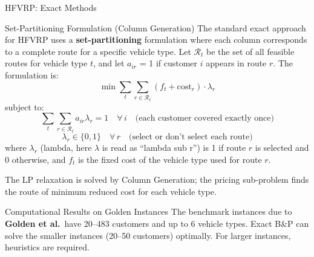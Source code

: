 \documentclass[aspectratio=169,10pt]{beamer}
\begin{document}
\begin{frame}[allowframebreaks]{HFVRP: Exact Methods}

\begin{block}{Set-Partitioning Formulation (Column Generation)}
  The standard exact approach for HFVRP uses a \textbf{set-partitioning}
  formulation where each column corresponds to a complete route for a specific
  vehicle type.  Let $\mathcal{R}_t$ be the set of all feasible routes for
  vehicle type $t$, and let $a_{ir}$ = 1 if customer $i$ appears in route
  $r$.  The formulation is:
  \[
    \min \sum_t \sum_{r \in \mathcal{R}_t} (f_t + \text{cost}_r) \cdot \lambda_r
  \]
  subject to:
  \[
    \sum_t \sum_{r \in \mathcal{R}_t} a_{ir} \lambda_r = 1 \quad \forall\, i
    \quad \text{(each customer covered exactly once)}
  \]
  \[
    \lambda_r \in \{0,1\} \quad \forall\, r
    \quad \text{(select or don't select each route)}
  \]
  where $\lambda_r$ (lambda, here $\lambda$ is read as ``lambda sub r'') is
  1 if route $r$ is selected and 0 otherwise, and $f_t$ is the fixed cost of
  the vehicle type used for route $r$.

  The LP relaxation is solved by Column Generation; the pricing sub-problem
  finds the route of minimum reduced cost for each vehicle type.
\end{block}

\begin{block}{Computational Results on Golden Instances}
  The benchmark instances due to \textbf{Golden et al.}\ have 20--483
  customers and up to 6 vehicle types.  Exact B\&P can solve the smaller
  instances (20--50 customers) optimally.  For larger instances, heuristics
  are required.
\end{block}

\end{frame}
\end{document}
